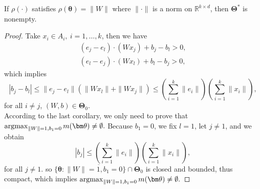 \begin{lemma}
	If $\rho(\cdot)$ satisfies $\rho(\bm\theta) = \|W\|$ where $\|\cdot\|$ is a norm on $\mathbb{R}^{k\times d}$,  then $\bm\Theta^*$ is nonempty.
\end{lemma}

\begin{proof}
	Take $x_i\in A_i,\ i = 1,\dots,k$, then we have
	\begin{align}
	(e_j-e_l)\cdot(W x_j) + b_j - b_l > 0,\\
	(e_l-e_j)\cdot(W x_l) + b_l - b_j > 0,
	\end{align}
	which implies
	\begin{equation}
	|b_j-b_l|\leq \|e_j-e_l\|(\|Wx_l\|+\|Wx_j\|)\leq  (\sum_{i=1}^{k}\|e_i\|)(\sum_{i=1}^{k} \|x_i\|),
	\end{equation}
	for all $i \neq j$, $ (W,b)\in \bm\Theta_0$.\\
	According to the last corollary, we only need to prove that $\mathop{\rm argmax}_{\|W\| = 1, b_1 = 0} m(\bm\theta) \neq \emptyset.$ Because $b_1 = 0$, we fix $l = 1$, let $j \neq 1$, and we obtain
	\begin{equation}
		|b_j|\leq (\sum_{i=1}^{k}\|e_i\|)(\sum_{i=1}^{k} \|x_i\|),
	\end{equation}
	for all $j \neq 1$. so $\overline{\{\bm\theta: \|W\| = 1, b_1 = 0\}\cap \bm\Theta_0}$ is closed and bounded, thus compact, which implies $\mathop{\rm argmax}_{\|W\| = 1, b_1 = 0} m(\bm\theta) \neq \emptyset.$
\end{proof}



